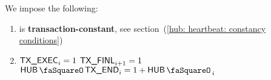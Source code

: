 We impose the following:
\begin{enumerate}
	\item \txEndStamp{} is \textbf{transaction-constant}, see section~(\ref{hub: heartbeat: constancy conditions})
	\item \If $\textsf{TX}\textsf{\_EXEC}_{i} = 1$ \et $\textsf{TX}\textsf{\_FINL}_{i + 1} = 1$ \Then $\txEndStamp_{i} = 1 + \hubStamp_{i}$
\end{enumerate}
